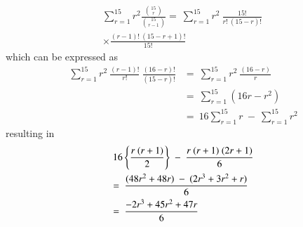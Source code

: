\begin{multline}
\sum_{r=1}^{15} r^2 \frac{\binom{15}{r}}{\binom{15}{r-1}}
	= \  \sum_{r=1}^{15} r^2 \  \frac{15!}{r!\ (15-r)!} 
	\\
	\times   \frac{(r-1)!\ (15-r+1)!}{15!}
\end{multline}
%
which can be expressed as
	\begin{align}
	\  \sum_{r=1}^{15} r^2 \  \frac{(r-1)!}{r!} \  \frac{(16-r)!}{(15-r)!} 
	&= \  \sum_{r=1}^{15} r^2 \  \frac{(16-r)}{r}\\
	&= \  \sum_{r=1}^{15} (16r-r^2) \\
	&= \  16 \sum_{r=1}^{15} r \  - \  \sum_{r=1}^{15} r^2 \nonumber
\end{align}
resulting in
\begin{align}	
	&\  16 \cbrak{\frac{r\ (r+1)}{2}} \  - \  \frac{r\ (r+1)\ (2r+1)}{6}\\
	&= \  \frac{(48r^2 + 48r) \  - \  (2r^3 + 3r^2 + r)}{6}\\
	&= \  \frac{-2r^3 + 45r^2 + 47r}{6}
\end{align}
	




